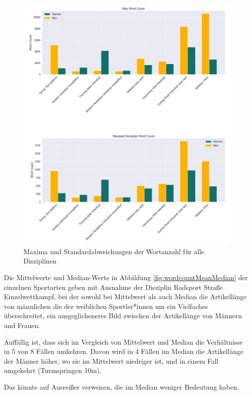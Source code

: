 \documentclass[11pt]{article}
\begin{document}
\begin{figure}
\includegraphics[width=1\textwidth]{figures/wordcount_max_std.png}
\caption[Maxima und Standardabweichungen der Wortanzahl für alle Disziplinen]{Maxima und Standardabweichungen der Wortanzahl für alle Disziplinen}
\label{fig:wordcountMaxStd}
\end{figure}

Die Mittelwerte und Median-Werte in Abbildung \ref{fig:wordcountMeanMedian} der einzelnen Sportarten geben mit Ausnahme der Disziplin Radsport Straße Einzelwettkampf, bei der sowohl bei Mittelwert als auch Median die Artikellänge von männlichen die der weiblichen Sportler*innen um ein Vielfaches überschreitet, ein ausgeglicheneres Bild zwischen der Artikellänge von Männern und Frauen.   

Auffällig ist, dass sich im Vergleich von Mittelwert und Median die Verhältnisse in 5 von 8 Fällen umkehren. Davon wird in 4 Fällen im Median die Artikellänge der Männer höher, wo sie im Mittelwert niedriger ist, und in einem Fall umgekehrt (Turmspringen 10m).

Das könnte auf Ausreißer verweisen, die im Median weniger Bedeutung haben.
\end{document}
